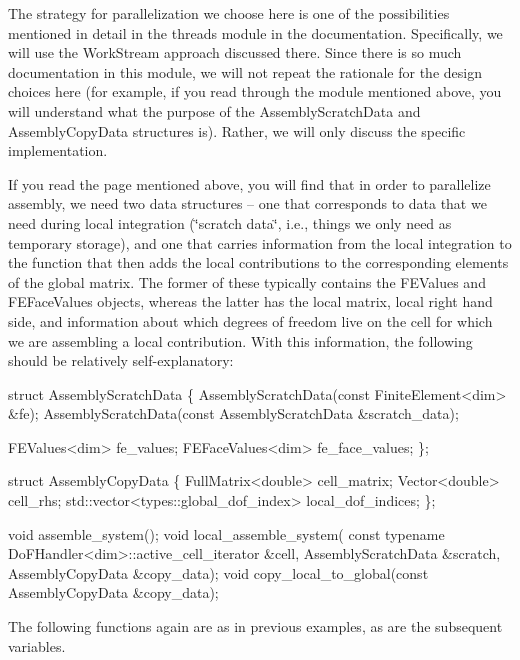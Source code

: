 The strategy for parallelization we choose here is one of the possibilities mentioned in detail in the threads module in the documentation. Specifically, we will use the Work\+Stream approach discussed there. Since there is so much documentation in this module, we will not repeat the rationale for the design choices here (for example, if you read through the module mentioned above, you will understand what the purpose of the {\ttfamily Assembly\+Scratch\+Data} and {\ttfamily Assembly\+Copy\+Data} structures is). Rather, we will only discuss the specific implementation.

If you read the page mentioned above, you will find that in order to parallelize assembly, we need two data structures -- one that corresponds to data that we need during local integration (\char`\"{}scratch data\char`\"{}, i.\+e., things we only need as temporary storage), and one that carries information from the local integration to the function that then adds the local contributions to the corresponding elements of the global matrix. The former of these typically contains the F\+E\+Values and F\+E\+Face\+Values objects, whereas the latter has the local matrix, local right hand side, and information about which degrees of freedom live on the cell for which we are assembling a local contribution. With this information, the following should be relatively self-\/explanatory\+:


\begin{DoxyCode}
\textcolor{keyword}{struct }AssemblyScratchData \{
    AssemblyScratchData(\textcolor{keyword}{const} FiniteElement<dim> &fe);
    AssemblyScratchData(\textcolor{keyword}{const} AssemblyScratchData &scratch\_data);

    FEValues<dim> fe\_values;
    FEFaceValues<dim> fe\_face\_values;
\};

\textcolor{keyword}{struct }AssemblyCopyData \{
    FullMatrix<double> cell\_matrix;
    Vector<double> cell\_rhs;
    std::vector<types::global\_dof\_index> local\_dof\_indices;
\};

\textcolor{keywordtype}{void} assemble\_system();
\textcolor{keywordtype}{void} local\_assemble\_system(
    \textcolor{keyword}{const} \textcolor{keyword}{typename} DoFHandler<dim>::active\_cell\_iterator &cell,
    AssemblyScratchData &scratch, AssemblyCopyData &copy\_data);
\textcolor{keywordtype}{void} copy\_local\_to\_global(\textcolor{keyword}{const} AssemblyCopyData &copy\_data);
\end{DoxyCode}


The following functions again are as in previous examples, as are the subsequent variables.


